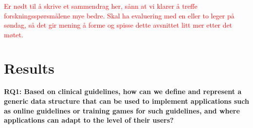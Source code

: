 \textcolor{red}{Er nødt til å skrive et sammendrag her, sånn at vi klarer å treffe forskningsspørsmålene mye bedre. Skal ha evaluering med en eller to leger på søndag, så det gir mening å forme og spisse dette avsnittet litt mer etter det møtet.}

\section{Results}
\paragraph{\textbf{RQ1:} Based on clinical guidelines, how can we define and represent a generic data structure that can be used to implement applications such as online guidelines or training games for such guidelines, and where applications can adapt to the level of their users?}
